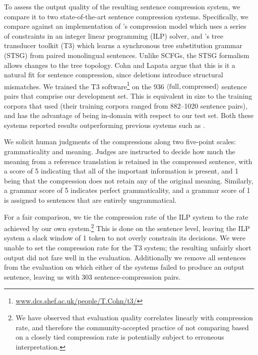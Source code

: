 \documentclass[11pt]{article}
\begin{document}
To assess the output quality of the resulting sentence compression
system, we compare it to two state-of-the-art sentence compression
systems.  Specifically, we compare against an implementation of
's compression model which uses a series of
constraints in an integer linear programming (ILP) solver, and
's tree transducer toolkit (T3) which learns a
synchronous tree substitution grammar (STSG) from paired monolingual
sentences.  Unlike SCFGs, the STSG formalism allows changes to the
tree topology. Cohn and Lapata argue that this is it a natural fit for
sentence compression, since deletions introduce structural mismatches.
We trained the T3
software\footnote{\url{www.dcs.shef.ac.uk/people/T.Cohn/t3/}} on the
936 $\langle\text{full}, \text{compressed}\rangle$ sentence pairs that
comprise our development set.  This is equivalent in size to the
training corpora that  used (their training corpora
ranged from 882--1020 sentence pairs), and has the advantage of being
in-domain with respect to our test set.  Both these systems reported
results outperforming previous systems such as .

We solicit human judgments of the compressions along two five-point
scales: grammaticality and meaning. Judges are instructed to decide
how much the meaning from a reference translation is retained in the
compressed sentence, with a score of 5 indicating that all of the
important information is present, and 1 being that the compression
does not retain any of the original meaning. Similarly, a grammar
score of 5 indicates perfect grammaticality, and a grammar score of 1
is assigned to sentences that are entirely ungrammatical.

For a fair comparison, we tie the compression rate of the ILP system
to the rate achieved by our own system.\footnote{We have observed that
  evaluation quality correlates linearly with compression rate, and
  therefore the community-accepted practice of not comparing based on
  a closely tied compression rate is potentially subject to erroneous
  interpretation.} This is done on the sentence level, leaving the ILP
system a slack window of 1 token to not overly constrain its
decisions. We were unable to set the compression rate for the T3
system; the resulting unfairly short output did not fare well in the
evaluation.  Additionally we remove all sentences from the evaluation
on which either of the systems failed to produce an output sentence,
leaving us with 303 sentence-compresssion pairs.
\end{document}
